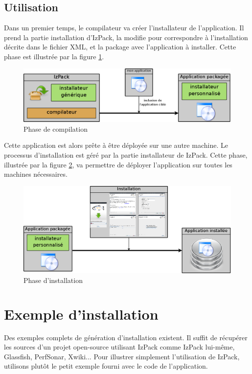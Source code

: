 \subsection{Utilisation}
Dans un premier temps, le compilateur va créer l'installateur de l'application.
Il prend la partie installation d'IzPack, la modifie pour correspondre à l'installation décrite dans le fichier XML, et la package avec l'application à installer. Cette phase est illustrée par la figure \ref{fig:partie_compil}.
\begin{figure}[H]
	\centering
	\includegraphics[width=\textwidth]{../image/partie_compil.png}
	\caption{Phase de compilation}
	\label{fig:partie_compil}
\end{figure}

Cette application est alors prête à être déployée sur une autre machine.
Le processus d'installation est géré par la partie installateur de IzPack.
Cette phase, illustrée par la figure \ref{fig:partie_install}, va permettre de déployer l'application sur toutes les machines nécessaires.
\begin{figure}[H]
	\centering
	\includegraphics[width=\textwidth]{../image/partie_install.png}
	\caption{Phase d'installation}
	\label{fig:partie_install}
\end{figure}

\section{Exemple d'installation}
Des exemples complets de génération d'installation existent.
Il suffit de récupérer les sources d'un projet open-source utilisant IzPack comme IzPack lui-même, Glassfish, PerfSonar, Xwiki... 
Pour illustrer simplement l'utilisation de IzPack, utilisons plutôt le petit exemple fourni avec le code de l'application.
